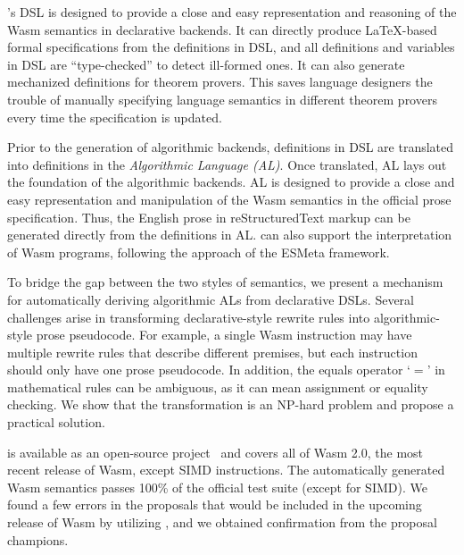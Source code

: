 \dslname's DSL is designed to provide a close and easy representation and reasoning of
the Wasm semantics in declarative backends.
It can directly produce LaTeX-based formal specifications from the definitions in DSL,
and all definitions and variables in DSL are ``type-checked'' to detect ill-formed ones.
It can also generate mechanized definitions for theorem provers.
This saves language designers the trouble of manually specifying
language semantics in different theorem provers every time the specification is updated.

Prior to the generation of algorithmic backends,
definitions in DSL are translated into definitions in the \emph{Algorithmic Language (AL)}.
Once translated, AL lays out the foundation of the algorithmic backends.
AL is designed to provide a close and easy representation and manipulation of
the Wasm semantics in the official prose specification.
Thus, the English prose in reStructuredText markup can be generated directly from the definitions in AL.
\dslname can also support the interpretation of Wasm programs,
following the approach of the ESMeta framework.

To bridge the gap between the two styles of semantics,
we present a mechanism for automatically deriving algorithmic ALs from declarative DSLs.
Several challenges arise in transforming declarative-style rewrite rules
into algorithmic-style prose pseudocode.
For example, a single Wasm instruction may have multiple rewrite rules
that describe different premises, but each instruction should only have one prose pseudocode.
In addition, the equals operator `$=$' in mathematical rules
can be ambiguous, as it can mean assignment or equality checking.
We show that the transformation is an NP-hard problem
and propose a practical solution.

\dslname is available as an open-source project~\cite{spectec}
and covers all of Wasm 2.0, the most recent release of Wasm,
except SIMD instructions.
The automatically generated Wasm semantics passes
100\% of the official test suite (except for SIMD).
We found a few errors in the proposals
that would be included in the upcoming release of Wasm by utilizing \dslname,
and we obtained confirmation from the proposal champions.

